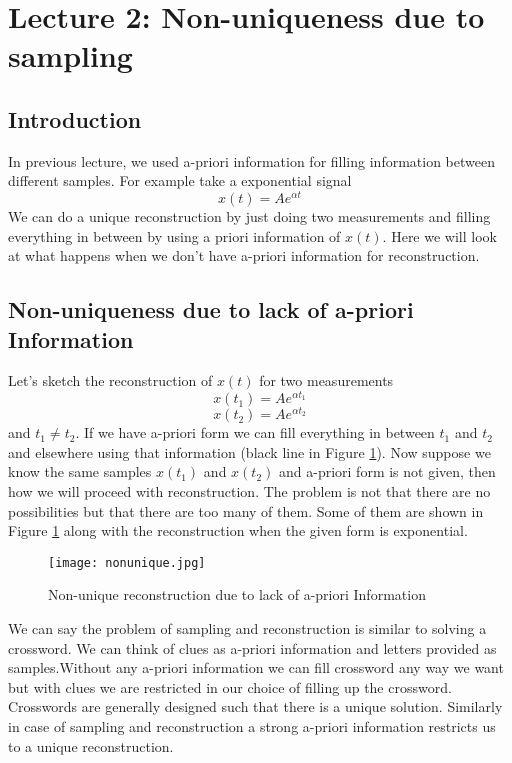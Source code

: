 \section{Lecture 2: Non-uniqueness due to sampling}

\subsection{Introduction}
In previous lecture, we used a-priori information for filling information between different samples. For example take a exponential signal $$x(t) = Ae^{\alpha t}$$ We can do a unique reconstruction by just doing two measurements and filling everything in between by using a priori information of $x(t)$. Here we will look at what happens when we don't have a-priori information for reconstruction. 

\subsection{Non-uniqueness due to lack of a-priori Information}

Let's sketch the reconstruction of $x(t)$ for two measurements $$x(t_{1})= Ae^{\alpha t_{1}}$$ $$x(t_{2})= Ae^{\alpha t_{2}}$$  and $t_{1}\neq t_{2}$. If we have a-priori form we can fill everything in between $t_{1}$ and $t_{2}$ and elsewhere using that information (black line in Figure \ref{fig:nonunique}). Now suppose we know the same samples $x(t_{1})$ and $x(t_{2})$ and a-priori form is not given, then how we will proceed with reconstruction. The problem is not that there are no possibilities but that there are too many of them. Some of them are shown in Figure \ref{fig:nonunique} along with the reconstruction when the given form is exponential. 

\begin{figure}[ht]
\centering
\texttt{[image: nonunique.jpg]}
\caption{\label{fig:nonunique}Non-unique reconstruction due to lack of a-priori Information}
\end{figure}

We can say the problem of sampling and reconstruction is similar to solving a crossword. We can think of clues as a-priori information and letters provided as samples.Without any a-priori information we can fill crossword any way we want but with clues we are restricted in our choice of filling up the crossword. Crosswords are generally designed such that there is a unique solution. Similarly in case of sampling and reconstruction a strong a-priori information restricts us to a unique reconstruction. 

